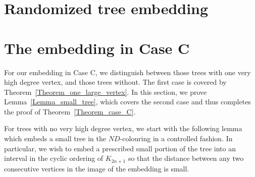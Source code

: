 \documentclass{article}
\theoremstyle{definition}
\begin{document}
\section{Randomized tree embedding}\label{sec:almost}











\section{The embedding in Case C}\label{sec:lastC}\label{sec:caseC}
For our embedding in Case C, we distinguish between those trees with one very high degree vertex, and those trees without. The first case is covered by Theorem~\ref{Theorem_one_large_vertex}. In this section, we prove Lemma~\ref{Lemma_small_tree}, which covers the second case and thus completes the proof of Theorem~\ref{Theorem_case_C}.

For trees with no very high degree vertex, we start with the following lemma which embeds a small tree in the $ND$-colouring in a controlled fashion. In particular, we wish to embed a prescribed small portion of the tree into an interval in the cyclic ordering of $K_{2n+1}$ so that the distance between any two consecutive vertices in the image of the embedding is small.
\end{document}
